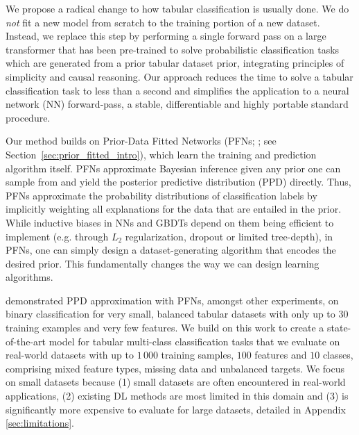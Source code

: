 \documentclass{article}
\begin{document}
We propose a radical change to how tabular classification is usually done. We do \emph{not} fit a new model from scratch to the training portion of a new dataset.
Instead, we replace this step by performing a single forward pass on a large transformer that has been pre-trained to solve probabilistic classification tasks which are generated from a prior tabular dataset prior, integrating principles of simplicity and causal reasoning.
Our approach reduces the time to solve a tabular classification task to less than a second and simplifies the application to a neural network (NN) forward-pass, a stable, differentiable and highly portable standard procedure.


Our method builds on Prior-Data Fitted Networks (PFNs; \citealp{muller-iclr22a}; see Section~\ref{sec:prior_fitted_intro}), which learn the training and prediction algorithm itself.
PFNs approximate Bayesian inference given any prior one can sample from and yield the posterior predictive distribution (PPD) directly. 
Thus, PFNs approximate the probability distributions of classification labels by implicitly weighting all explanations for the data that are entailed in the prior.
While inductive biases in NNs and GBDTs depend on them being efficient to implement (e.g. through $L_2$ regularization, dropout \citep{srivastava-jmlr14a} or limited tree-depth), in PFNs, one can simply design a dataset-generating algorithm that encodes the desired prior. This fundamentally changes the way we can design learning algorithms.

\cite{muller-iclr22a} demonstrated PPD approximation with PFNs, amongst other experiments, on binary classification for very small, balanced tabular datasets with only up to $30$ training examples and very few features.
We build on this work to create a state-of-the-art model for tabular multi-class classification tasks that we evaluate on real-world datasets with up to $1\,000$ training samples, $100$ features and $10$ classes, comprising mixed feature types, missing data and unbalanced targets.
We focus on small datasets because (1) small datasets are often encountered in real-world applications, (2) existing DL methods are most limited in this domain and (3) \methodname{} is significantly more expensive to evaluate for large datasets, detailed in Appendix \ref{sec:limitations}.
\end{document}
